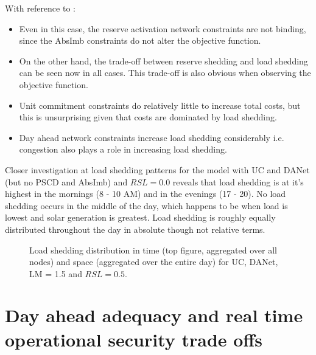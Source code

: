 \documentclass[number,times]{elsarticle}
\begin{document}

With reference to :

\begin{itemize}
    \item Even in this case, the reserve activation network constraints are not binding, since the AbsImb constraints do not alter the objective function.
    \item On the other hand, the trade-off between reserve shedding and load shedding can be seen now in all cases. This trade-off is also obvious when observing the objective function.
    \item Unit commitment constraints do relatively little to increase total costs, but this is unsurprising given that costs are dominated by load shedding.
    \item Day ahead network constraints increase load shedding considerably i.e. congestion also plays a role in increasing load shedding.
\end{itemize}

Closer investigation at load shedding patterns for the model with UC and DANet (but no PSCD and AbsImb) and $RSL = 0.0$ reveals that load shedding is at it's highest in the mornings (8 - 10 AM) and in the evenings (17 - 20). No load shedding occurs in the middle of the day, which happens to be when load is lowest and solar generation is greatest. Load shedding is roughly equally distributed throughout the day in absolute though not relative terms.

\begin{figure}[H]
    \centering
    \begin{subfigure}[t]{0.45\textwidth}
        \centering
        \caption{}
    \end{subfigure}
    \newline
    \begin{subfigure}[t]{0.45\textwidth}
        \centering
        \caption{}
    \end{subfigure}
    \begin{subfigure}[t]{0.45\textwidth}
        \centering
        \caption{}
    \end{subfigure}
    \caption{Load shedding distribution in time (top figure, aggregated over all nodes) and space (aggregated over the entire day) for UC, DANet, LM = 1.5 and $RSL = 0.5$.}
\end{figure}

\section{Day ahead adequacy and real time operational security trade offs} \label{sec:adequacy_vs_security}
\end{document}
